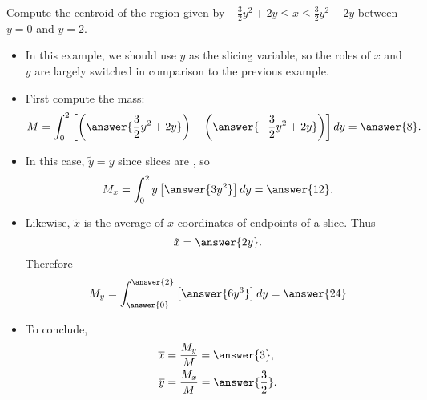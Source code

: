\documentclass{ximera}
\begin{document}
\begin{example}%
Compute the centroid of the region given by ${-\frac{3}{2}y^2+2y} \leq x \leq {\frac{3}{2}y^2+2y}$ between $y = 0$ and $y = 2$.
\begin{itemize}
\item In this example, we should use $y$ as the slicing variable, so the roles of $x$ and $y$ are largely switched in comparison to the previous example.
\item First compute the mass:
\[ M = \int_{0}^{2} \left[ \left(\answer{\frac{3}{2}y^2+2y}\right) - \left(\answer{-\frac{3}{2}y^2+2y}\right) \right] dy = \answer{8}. \]
\item In this case, $\tilde y = y$ since slices are , so
\[ M_x = \int_{0}^{2} y \left[ \answer{3 y^2} \right] dy  = \answer{12}. \]
\item Likewise, $\tilde x$ is the average of $x$-coordinates of endpoints of a slice. Thus
\[ \tilde x = \answer{ 2y}. \]
Therefore
\[ M_y =  \int_{\answer{0}}^{\answer{2}} \left[ \answer{6y^3} \right] dy = \answer{24} \]
\item To conclude,
$$ \begin{aligned}
 \overline{x} &  = \frac{M_y}{M} = \answer{3}, \\
 \overline{y} &  = \frac{M_x}{M} = \answer{\frac{3}{2}}.
\end{aligned}$$
\end{itemize}
\end{example}
\end{document}
